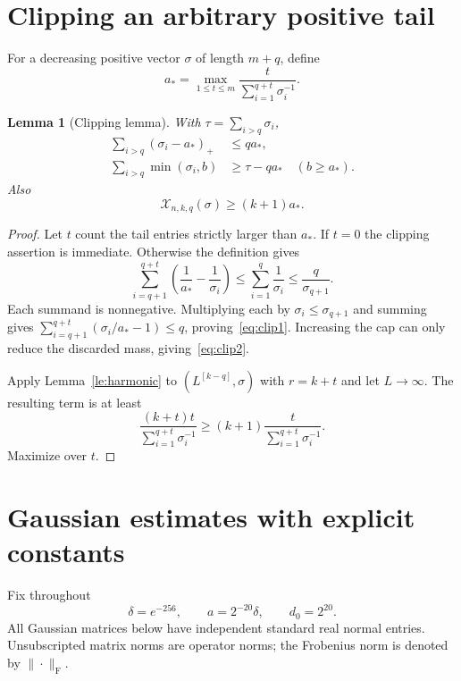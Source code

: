 \documentclass[11pt]{article}
\newtheorem{lemma}[theorem]{Lemma}
\theoremstyle{remark}\newtheorem{remark}[theorem]{Remark}
\newcommand{\F}{\mathrm F}
\newcommand{\X}{\mathcal X}
\begin{document}
\section{Clipping an arbitrary positive tail}\label{sec:clip}
For a decreasing positive vector $\sigma$ of length $m+q$, define
\[
 a_* =\max_{1\le t\le m}
 \frac{t}{\sum_{i=1}^{q+t}\sigma_i^{-1}}.
\]
\begin{lemma}[Clipping lemma]\label{le:clip}
With $\tau=\sum_{i>q}\sigma_i$,
\begin{align}
 \sum_{i>q}(\sigma_i-a_*)_+&\le q a_*,\label{eq:clip1}\\
 \sum_{i>q}\min(\sigma_i,b)&\ge\tau-q a_*
 \quad(b\ge a_*).\label{eq:clip2}
\end{align}
Also
\begin{equation}\label{eq:harmonicprofile}
 \X_{n,k,q}(\sigma)\ge(k+1)a_*.
\end{equation}
\end{lemma}
\begin{proof}
Let $t$ count the tail entries strictly larger than $a_*$. If $t=0$ the clipping assertion is immediate. Otherwise the definition gives
\[
 \sum_{i=q+1}^{q+t}\left(\frac1{a_*}-\frac1{\sigma_i}\right)
 \le\sum_{i=1}^{q}\frac1{\sigma_i}
 \le\frac{q}{\sigma_{q+1}}.
\]
Each summand is nonnegative. Multiplying each by $\sigma_i\le\sigma_{q+1}$ and summing gives
$\sum_{i=q+1}^{q+t}(\sigma_i/a_*-1)\le q$, proving~\eqref{eq:clip1}. Increasing the cap can only reduce the discarded mass, giving~\eqref{eq:clip2}.

Apply Lemma~\ref{le:harmonic} to $(L^{[k-q]},\sigma)$ with $r=k+t$ and let $L\to\infty$. The resulting term is at least
\[
 \frac{(k+t)t}{\sum_{i=1}^{q+t}\sigma_i^{-1}}
 \ge (k+1)\frac{t}{\sum_{i=1}^{q+t}\sigma_i^{-1}}.
\]
Maximize over $t$.
\end{proof}

\section{Gaussian estimates with explicit constants}\label{sec:gaussian}
Fix throughout
\begin{equation}\label{eq:constants}
 \delta=e^{-256},\qquad a=2^{-20}\delta,\qquad d_0=2^{20}.
\end{equation}
All Gaussian matrices below have independent standard real normal entries. Unsubscripted matrix norms are operator norms; the Frobenius norm is denoted by $\|\cdot\|_\F$.
\end{document}
